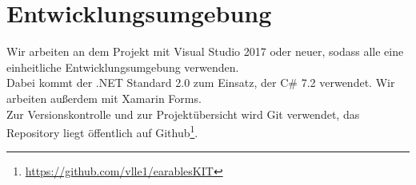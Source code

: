 \documentclass[a4paper,12pt]{article}
\begin{document}
\section{Entwicklungsumgebung}
Wir arbeiten an dem Projekt mit Visual Studio 2017 oder neuer, sodass alle eine einheitliche Entwicklungsumgebung verwenden.\\
Dabei kommt der .NET Standard 2.0 zum Einsatz, der C\# 7.2 verwendet. Wir arbeiten außerdem mit Xamarin Forms.\\
Zur Versionskontrolle und zur Projektübersicht wird Git verwendet, das Repository liegt öffentlich auf Github\footnote{\url{https://github.com/vlle1/earablesKIT}}.
\clearpage
\printglossaries
{}
\end{document}
